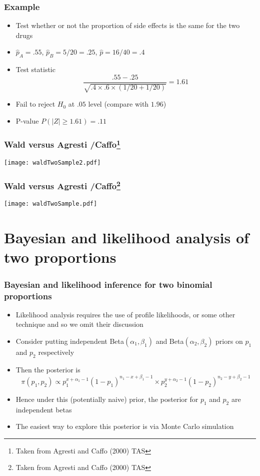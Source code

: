 \documentclass[aspectratio=169]{beamer}
\begin{document}
\begin{frame}\frametitle{Example} 
  \begin{itemize}
  \item Test whether or not the proportion of side effects is the same
    for the two drugs
  \item $\hat p_A = .55$, $\hat p_B = 5 / 20 = .25$, $\hat p = 16 / 40 = .4$
  \item Test statistic
    $$
    \frac{.55 - .25}{\sqrt{.4 \times .6 \times (1 / 20 + 1 / 20)}} = 1.61
    $$
  \item Fail to reject $H_0$ at $.05$ level (compare with $1.96$)
  \item P-value $P(|Z| \geq 1.61) = .11$
  \end{itemize}
\end{frame}

\begin{frame}\frametitle{Wald versus Agresti /Caffo\footnote{Taken from Agresti and Caffo (2000) TAS }}
\begin{center}
\texttt{[image: waldTwoSample2.pdf]}
\end{center}
\end{frame}

\begin{frame}\frametitle{Wald versus Agresti /Caffo\footnote{Taken from Agresti and Caffo (2000) TAS }}
\begin{center}
\texttt{[image: waldTwoSample.pdf]}
\end{center}
\end{frame}

\section{Bayesian and likelihood analysis of two proportions}
\begin{frame}\frametitle{Bayesian and likelihood inference for two binomial proportions}
  \begin{itemize}
  \item Likelihood analysis requires the use of profile likelihoods,
    or some other technique and so we omit their discussion
  \item Consider putting independent Beta$(\alpha_1, \beta_1)$ and Beta$(\alpha_2, \beta_2)$ priors
    on $p_1$ and $p_2$ respectively
  \item Then the posterior is
$$
\pi(p_1, p_2) \propto p_1^{x + \alpha_1 - 1}(1 - p_1)^{n_1 -x + \beta_1 - 1} \times  p_2^{y+\alpha_2 -1}(1 - p_2)^{n_2 - y +\beta_2-1}
$$
  \item Hence under this (potentially naive) prior, the posterior for $p_1$ and $p_2$ are independent
    betas
  \item The easiest way to explore this posterior is via Monte Carlo simulation
  \end{itemize}
\end{frame}
\end{document}
